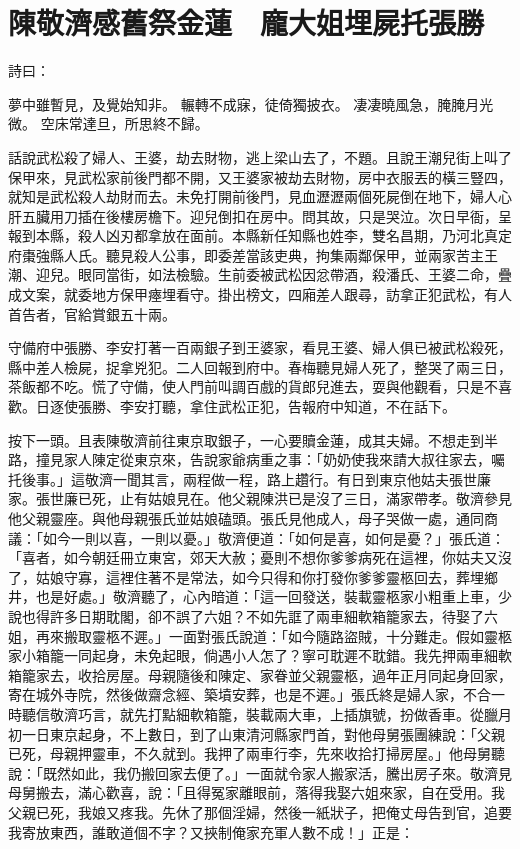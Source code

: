 %

\chapter{陳敬濟感舊祭金蓮　龐大姐埋屍托張勝}

詩曰：

夢中雖暫見，及覺始知非。
輾轉不成寐，徒倚獨披衣。
凄凄曉風急，腌腌月光微。
空床常達旦，所思終不歸。

話說武松殺了婦人、王婆，劫去財物，逃上梁山去了，不題。且說王潮兒街上叫了保甲來，見武松家前後門都不開，又王婆家被劫去財物，房中衣服丟的橫三豎四，就知是武松殺人劫財而去。未免打開前後門，見血瀝瀝兩個死屍倒在地下，婦人心肝五臟用刀插在後樓房檐下。迎兒倒扣在房中。問其故，只是哭泣。次日早衙，呈報到本縣，殺人凶刃都拿放在面前。本縣新任知縣也姓李，雙名昌期，乃河北真定府棗強縣人氏。聽見殺人公事，即委差當該吏典，拘集兩鄰保甲，並兩家苦主王潮、迎兒。眼同當街，如法檢驗。生前委被武松因忿帶酒，殺潘氏、王婆二命，疊成文案，就委地方保甲瘞埋看守。掛出榜文，四廂差人跟尋，訪拿正犯武松，有人首告者，官給賞銀五十兩。

守備府中張勝、李安打著一百兩銀子到王婆家，看見王婆、婦人俱已被武松殺死，縣中差人檢屍，捉拿兇犯。二人回報到府中。春梅聽見婦人死了，整哭了兩三日，茶飯都不吃。慌了守備，使人門前叫調百戲的貨郎兒進去，耍與他觀看，只是不喜歡。日逐使張勝、李安打聽，拿住武松正犯，告報府中知道，不在話下。

按下一頭。且表陳敬濟前往東京取銀子，一心要贖金蓮，成其夫婦。不想走到半路，撞見家人陳定從東京來，告說家爺病重之事：「奶奶使我來請大叔往家去，囑托後事。」這敬濟一聞其言，兩程做一程，路上趲行。有日到東京他姑夫張世廉家。張世廉已死，止有姑娘見在。他父親陳洪已是沒了三日，滿家帶孝。敬濟參見他父親靈座。與他母親張氏並姑娘磕頭。張氏見他成人，母子哭做一處，通同商議：「如今一則以喜，一則以憂。」敬濟便道：「如何是喜，如何是憂？」張氏道：「喜者，如今朝廷冊立東宮，郊天大赦；憂則不想你爹爹病死在這裡，你姑夫又沒了，姑娘守寡，這裡住著不是常法，如今只得和你打發你爹爹靈柩回去，葬埋鄉井，也是好處。」敬濟聽了，心內暗道：「這一回發送，裝載靈柩家小粗重上車，少說也得許多日期耽閣，卻不誤了六姐？不如先誆了兩車細軟箱籠家去，待娶了六姐，再來搬取靈柩不遲。」一面對張氏說道：「如今隨路盜賊，十分難走。假如靈柩家小箱籠一同起身，未免起眼，倘遇小人怎了？寧可耽遲不耽錯。我先押兩車細軟箱籠家去，收拾房屋。母親隨後和陳定、家眷並父親靈柩，過年正月同起身回家，寄在城外寺院，然後做齋念經、築墳安葬，也是不遲。」張氏終是婦人家，不合一時聽信敬濟巧言，就先打點細軟箱籠，裝載兩大車，上插旗號，扮做香車。從臘月初一日東京起身，不上數日，到了山東清河縣家門首，對他母舅張團練說：「父親已死，母親押靈車，不久就到。我押了兩車行李，先來收拾打掃房屋。」他母舅聽說：「既然如此，我仍搬回家去便了。」一面就令家人搬家活，騰出房子來。敬濟見母舅搬去，滿心歡喜，說：「且得冤家離眼前，落得我娶六姐來家，自在受用。我父親已死，我娘又疼我。先休了那個淫婦，然後一紙狀子，把俺丈母告到官，追要我寄放東西，誰敢道個不字？又挾制俺家充軍人數不成！」正是：

